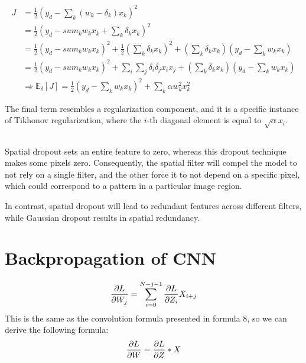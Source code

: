 \documentclass{article}
\newcommand*{\ex}[1]{
    \mathbb{E}_{#1}
}
\begin{document}
\subsection{}
\begin{align*}
    J 
    &= \frac{1}{2}(y_d - \sum_{k}(w_k - \delta_k)x_k)^2 \\
    &= \frac{1}{2}(y_d - sum_{k}w_kx_k + \sum_{k}\delta_kx_k)^2 \\
    &= \frac{1}{2}(y_d - sum_{k}w_kx_k)^2 + \frac{1}{2}(\sum_{k}\delta_kx_k)^2 + (\sum_k\delta_kx_k)(y_d - \sum_{k}w_kx_k) \\
    &= \frac{1}{2}(y_d - sum_{k}w_kx_k)^2 + \sum_{i}\sum_{j}\delta_i\delta_jx_ix_j +  (\sum_k\delta_kx_k)(y_d - \sum_{k}w_kx_k) \\
    &\Rightarrow \ex{\delta}[J] = \frac{1}{2}(y_d - \sum_{k}w_kx_k)^2 + \sum_{k} \alpha w_k^2x_k^2
\end{align*}

The final term resembles a regularization component, and it is a specific instance 
of Tikhonov regularization, where the $i$-th diagonal element is equal 
to $\sqrt{\alpha} x_i$.

\subsection{}
Spatial dropout sets an entire feature to zero, whereas this dropout technique 
makes some pixels zero. Consequently, the spatial filter will compel the model 
to not rely on a single filter, and the other force it to not depend on a specific
 pixel, which could correspond to a pattern in a particular image region.

In contrast, spatial dropout will lead to redundant features across different 
filters, while Gaussian dropout results in spatial redundancy.

\section{Backpropagation of CNN}
\begin{align*}
    \pdv{L}{W_j} = \sum_{i = 0}^{N - j - 1} \pdv{L}{Z_i} X_{i + j}
\end{align*}
This is the same as the convolution formula presented in formula 8, so we can 
derive the following formula:
\begin{align*}
    \pdv{L}{W} = \pdv{L}{Z} * X
\end{align*}
\end{document}
